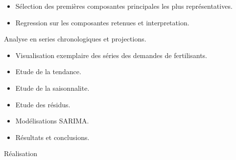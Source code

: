 \begin{description}[align=left]
\begin{itemize}
							\item Sélection des premières composantes principales les plus représentatives.
							\item Regression sur les composantes retenues et interpretation.
						\end{itemize} %
		\item[Lot V :] Analyse en series chronologiques et projections.
						\begin{itemize}
							\item Visualisation exemplaire des séries des demandes de fertilisants.
							\item Etude de la tendance.
							\item Etude de la saisonnalite.
							\item Etude des résidus.
							\item Modélisations SARIMA.
							\item Résultats et conclusions.
						\end{itemize}
		\item[Lot VI :] Réalisation
	\end{description}
